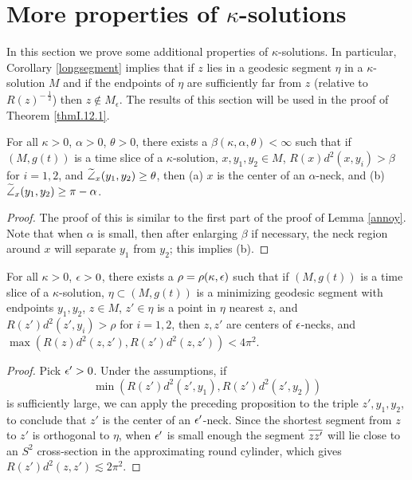 \section{More properties of $\kappa$-solutions}

In  this section we prove some additional properties of
$\kappa$-solutions. In particular, Corollary \ref{longsegment} implies
that if
$z$
lies in a geodesic segment $\eta$ in a $\kappa$-solution $M$
and if the endpoints of $\eta$ are sufficiently far from
$z$ (relative to $R(z)^{- \: \frac12}$) then $z \notin M_\epsilon$.
The results of this section will be used in the proof of Theorem
\ref{thmI.12.1}.

\begin{proposition}
  \label{prop:kl-more-properties-solutions-existence-kappa-solutions}

\label{neckcrit}
For all $\kappa>0$, $\alpha>0$, $\theta>0$,
there exists a $\beta(\kappa,\alpha,\theta)<\infty$
such that if $(M,g(t))$ is a time slice of a $\kappa$-solution,
$x,y_1,y_2\in M$, $R(x)d^2(x,y_i)>\beta$ for $i=1,2$, and $\widetilde{\angle}_x(y_1,y_2)\geq \theta$,
then (a) $x$ is the center of
 an $\alpha$-neck, and (b) $\widetilde{\angle}_x(y_1,y_2)\geq \pi-
\alpha$.
\end{proposition}
\begin{proof}
The proof of this is similar to the first part of the proof of
Lemma \ref{annoy}.  Note that when $\alpha$ is small, then after enlarging
$\beta$ if necessary, the neck region around $x$ will separate
$y_1$ from $y_2$; this implies (b).
\end{proof}

\begin{corollary}
  \label{cor:kl-more-properties-solutions-existence-kappa-solutions}
 \label{longsegment}
For all $\kappa>0$, $\epsilon>0$, there exists a $\rho=\rho(\kappa,\epsilon)$ such that
if $(M,g(t))$ is a time slice of a $\kappa$-solution, $\eta\subset (M,g(t))$
is a minimizing geodesic segment with endpoints $y_1,y_2$, $z\in M$, $z'\in \eta$
is a point in $\eta$ nearest $z$, and $R(z')d^2(z',y_i)>\rho$
for $i=1,2$, then
$z,z'$ are centers of
$\epsilon$-necks, and $\max(R(z)d^2(z,z'),R(z')d^2(z,z'))<4\pi^2$.
\end{corollary}
\begin{proof}
Pick $\epsilon'>0$.  Under the assumptions, if
\begin{equation}
\min(R(z')d^2(z',y_1),R(z')d^2(z',y_2))
\end{equation}
is sufficiently large, we can apply the preceding proposition
to the triple $z',y_1,y_2$, to conclude that $z'$ is the center of an
$\epsilon'$-neck.  Since the shortest segment from $z$ to $z'$
is orthogonal to $\eta$, when $\epsilon'$ is small enough
the segment $\overline{zz'}$ will lie close to an $S^2$ cross-section
in the approximating round cylinder, which
gives $R(z')d^2(z,z')\lesssim 2\pi^2$.
\end{proof}

